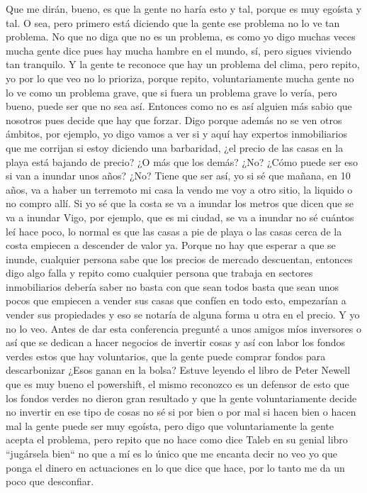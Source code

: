 Que me dirán, bueno, es que la gente no haría esto y tal, porque es muy egoísta y tal. O sea, pero primero está diciendo que la gente ese problema no lo ve tan problema. No que no diga que no es un problema, es como yo digo muchas veces mucha gente dice pues hay mucha hambre en el mundo, sí, pero sigues viviendo tan tranquilo. Y la gente te reconoce que hay un problema del clima, pero repito, yo por lo que veo no lo prioriza, porque repito, voluntariamente mucha gente no lo ve como un problema grave, que si fuera un problema grave lo vería, pero bueno, puede ser que no sea así. Entonces como no es así alguien más sabio que nosotros pues decide que hay que forzar. Digo porque además no se ven otros ámbitos, por ejemplo, yo digo vamos a ver si y aquí hay expertos inmobiliarios que me corrijan si estoy diciendo una barbaridad, ¿el precio de las casas en la playa está bajando de precio? ¿O más que los demás? ¿No? ¿Cómo puede ser eso si van a inundar unos años? ¿No? Tiene que ser así, yo si sé que mañana, en 10 años, va a haber un terremoto mi casa la vendo me voy a otro sitio, la liquido o no compro allí. Si yo sé que la costa se va a inundar los metros que dicen que se va a inundar Vigo, por ejemplo, que es mi ciudad, se va a inundar no sé cuántos leí hace poco, lo normal es que las casas a pie de playa o las casas cerca de la costa empiecen a descender de valor ya. Porque no hay que esperar a que se inunde, cualquier persona sabe que los precios de mercado descuentan, entonces digo algo falla y repito como cualquier persona que trabaja en sectores inmobiliarios debería saber no basta con que sean todos basta que sean unos pocos que empiecen a vender sus casas que confíen en todo esto, empezarían a vender sus propiedades y eso se notaría de alguna forma u otra en el precio. Y yo no lo veo. Antes de dar esta conferencia pregunté a unos amigos míos inversores o así que se dedican a hacer negocios de invertir cosas y así con labor los fondos verdes estos que hay voluntarios, que la gente puede comprar fondos para descarbonizar ¿Esos ganan en la bolsa? Estuve leyendo el libro de Peter Newell que es muy bueno el powershift, el mismo reconozco es un defensor de esto que los fondos verdes no dieron gran resultado y que la gente voluntariamente decide no invertir en ese tipo de cosas no sé si por bien o por mal si hacen bien o hacen mal la gente puede ser muy egoísta, pero digo que voluntariamente la gente acepta el problema, pero repito que no hace como dice Taleb en su genial libro ``jugársela bien`` no que a mí es lo único que me encanta decir no veo yo que ponga el dinero en actuaciones en lo que dice que hace, por lo tanto me da un poco que desconfiar. 

